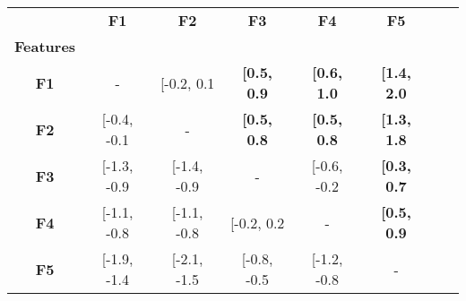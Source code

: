 \setcellgapes{1ex}\makegapedcells\centering\begin{tabular*}{\textwidth}{c|@{\extracolsep{\fill}}ccccccc}
\toprule
{} &  \textbf{F1} &  \textbf{F2} &         \textbf{F3} &         \textbf{F4} &         \textbf{F5} \\
\textbf{Features} &              &              &                     &                     &                     \\
\midrule
\textbf{F1      } &  - &  [-0.2, 0.1 &  \textbf{[0.5, 0.9} &  \textbf{[0.6, 1.0} &  \textbf{[1.4, 2.0} \\
\textbf{F2      } &  [-0.4, -0.1 &  - &  \textbf{[0.5, 0.8} &  \textbf{[0.5, 0.8} &  \textbf{[1.3, 1.8} \\
\textbf{F3      } &  [-1.3, -0.9 &  [-1.4, -0.9 &  - &  [-0.6, -0.2 &  \textbf{[0.3, 0.7} \\
\textbf{F4      } &  [-1.1, -0.8 &  [-1.1, -0.8 &  [-0.2, 0.2 &  - &  \textbf{[0.5, 0.9} \\
\textbf{F5      } &  [-1.9, -1.4 &  [-2.1, -1.5 &  [-0.8, -0.5 &  [-1.2, -0.8 &  - \\
\bottomrule
\end{tabular*}
